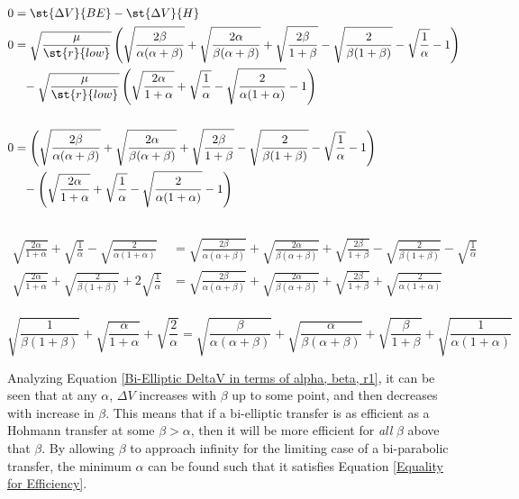 \documentclass[../basicOrbitalDynamics.tex]{subfiles}
\begin{document}

\begin{align*}
    0 &=\st{\Delta V}{BE}-\st{\Delta V}{H}\\
    0 &=\sqrt{\frac{\mu}{\st{r}{low}}}\left(\sqrt{\frac{2\beta}{\alpha(\alpha+\beta)}}+\sqrt{\frac{2\alpha}{\beta(\alpha+\beta)}}+\sqrt{\frac{2\beta}{1+\beta}}-\sqrt{\frac{2}{\beta(1+\beta)}}-\sqrt{\frac{1}{\alpha}}-1\right) \\
      & \phantom{=}-\sqrt{\frac{\mu}{\st{r}{low}}}\left(\sqrt{\frac{2\alpha}{1+\alpha}}+\sqrt{\frac{1}{\alpha}}-\sqrt{\frac{2}{\alpha(1+\alpha)}}-1\right) \\\\
    0 &=\left(\sqrt{\frac{2\beta}{\alpha(\alpha+\beta)}}+\sqrt{\frac{2\alpha}{\beta(\alpha+\beta)}}+\sqrt{\frac{2\beta}{1+\beta}}-\sqrt{\frac{2}{\beta(1+\beta)}}-\sqrt{\frac{1}{\alpha}}-1\right) \\
      & \phantom{=}-\left(\sqrt{\frac{2\alpha}{1+\alpha}}+\sqrt{\frac{1}{\alpha}}-\sqrt{\frac{2}{\alpha(1+\alpha)}}-1\right) \\\\
\end{align*}
\begin{align*}
    \sqrt{\frac{2\alpha}{1+\alpha}}+\sqrt{\frac{1}{\alpha}}-\sqrt{\frac{2}{\alpha(1+\alpha)}} &=\sqrt{\frac{2\beta}{\alpha(\alpha+\beta)}}+\sqrt{\frac{2\alpha}{\beta(\alpha+\beta)}}+\sqrt{\frac{2\beta}{1+\beta}}-\sqrt{\frac{2}{\beta(1+\beta)}}-\sqrt{\frac{1}{\alpha}} \\
    \sqrt{\frac{2\alpha}{1+\alpha}}+\sqrt{\frac{2}{\beta(1+\beta)}}+2\sqrt{\frac{1}{\alpha}}&=\sqrt{\frac{2\beta}{\alpha(\alpha+\beta)}}+\sqrt{\frac{2\alpha}{\beta(\alpha+\beta)}}+\sqrt{\frac{2\beta}{1+\beta}}+\sqrt{\frac{2}{\alpha(1+\alpha)}} \\
\end{align*}

\begin{equation}\label{Equality for Efficiency}
    \sqrt{\frac{1}{\beta(1+\beta)}}+\sqrt{\frac{\alpha}{1+\alpha}}+\sqrt{\frac{2}{\alpha}}=\sqrt{\frac{\beta}{\alpha(\alpha+\beta)}}+\sqrt{\frac{\alpha}{\beta(\alpha+\beta)}}+\sqrt{\frac{\beta}{1+\beta}}+\sqrt{\frac{1}{\alpha(1+\alpha)}}
\end{equation}

Analyzing Equation \eqref{Bi-Elliptic DeltaV in terms of alpha, beta, r1}, it can be seen that at any $\alpha$, $\Delta V$ increases with $\beta$ up to some point, and then decreases with increase in $\beta$. This means that if a bi-elliptic transfer is as efficient as a Hohmann transfer at some $\beta>\alpha$, then it will be more efficient for \textit{all} $\beta$ above that $\beta$. By allowing $\beta$ to approach infinity for the limiting case of a bi-parabolic transfer, the minimum $\alpha$ can be found such that it satisfies Equation \eqref{Equality for Efficiency}.
\end{document}
